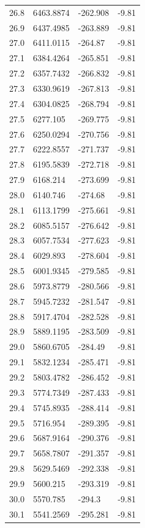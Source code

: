 \begin{table}[H]
\begin{tabular}{llll}
26.8 & 6463.8874 & -262.908 & -9.81 \\
26.9 & 6437.4985 & -263.889 & -9.81 \\
27.0 & 6411.0115 & -264.87 & -9.81 \\
27.1 & 6384.4264 & -265.851 & -9.81 \\
27.2 & 6357.7432 & -266.832 & -9.81 \\
27.3 & 6330.9619 & -267.813 & -9.81 \\
27.4 & 6304.0825 & -268.794 & -9.81 \\
27.5 & 6277.105 & -269.775 & -9.81 \\
27.6 & 6250.0294 & -270.756 & -9.81 \\
27.7 & 6222.8557 & -271.737 & -9.81 \\
27.8 & 6195.5839 & -272.718 & -9.81 \\
27.9 & 6168.214 & -273.699 & -9.81 \\
28.0 & 6140.746 & -274.68 & -9.81 \\
28.1 & 6113.1799 & -275.661 & -9.81 \\
28.2 & 6085.5157 & -276.642 & -9.81 \\
28.3 & 6057.7534 & -277.623 & -9.81 \\
28.4 & 6029.893 & -278.604 & -9.81 \\
28.5 & 6001.9345 & -279.585 & -9.81 \\
28.6 & 5973.8779 & -280.566 & -9.81 \\
28.7 & 5945.7232 & -281.547 & -9.81 \\
28.8 & 5917.4704 & -282.528 & -9.81 \\
28.9 & 5889.1195 & -283.509 & -9.81 \\
29.0 & 5860.6705 & -284.49 & -9.81 \\
29.1 & 5832.1234 & -285.471 & -9.81 \\
29.2 & 5803.4782 & -286.452 & -9.81 \\
29.3 & 5774.7349 & -287.433 & -9.81 \\
29.4 & 5745.8935 & -288.414 & -9.81 \\
29.5 & 5716.954 & -289.395 & -9.81 \\
29.6 & 5687.9164 & -290.376 & -9.81 \\
29.7 & 5658.7807 & -291.357 & -9.81 \\
29.8 & 5629.5469 & -292.338 & -9.81 \\
29.9 & 5600.215 & -293.319 & -9.81 \\
30.0 & 5570.785 & -294.3 & -9.81 \\
30.1 & 5541.2569 & -295.281 & -9.81 \\

\end{tabular}
\end{table}
